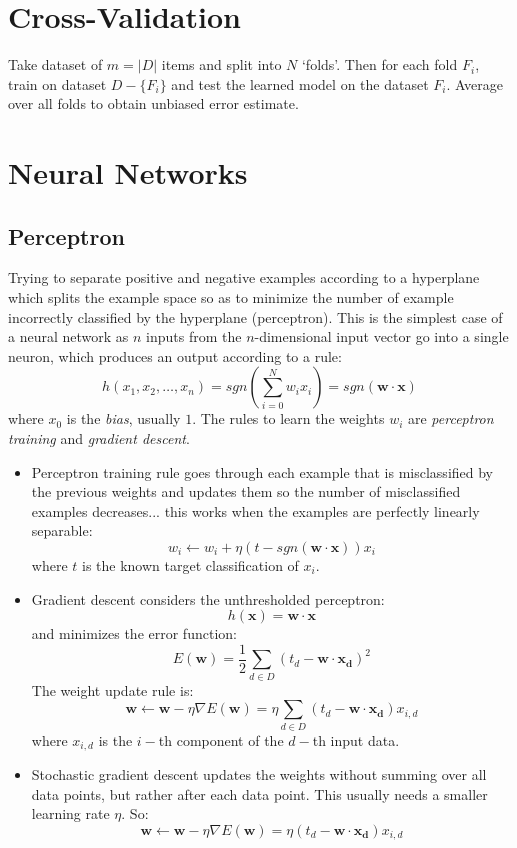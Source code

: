 \documentclass[a4paper,10pt]{article}
\begin{document}
\section{Cross-Validation}
Take dataset of $m = |D|$ items and split into $N$ `folds'.  Then for each fold $F_i$, train on dataset $D - \{F_i\}$ and test the learned model on the dataset $F_i$.  Average over all folds to obtain unbiased error estimate.

\section{Neural Networks}
\subsection{Perceptron}
Trying to separate positive and negative examples according to a hyperplane which splits the example space so as to minimize the number of example incorrectly classified by the hyperplane (perceptron).  This is the simplest case of a neural network as $n$ inputs from the $n$-dimensional input vector go into a single neuron, which produces an output according to a rule:
$$
h(x_1, x_2, \ldots, x_n) = sgn\left(\sum_{i=0}^N w_i x_i\right) = sgn(\mathbf{w}\cdot\mathbf{x})
$$
where $x_0$ is the \emph{bias}, usually $1$.  The rules to learn the weights $w_i$ are \emph{perceptron training} and \emph{gradient descent}.
\begin{itemize}
\item Perceptron training rule goes through each example that is misclassified by the previous weights and updates them so the number of misclassified examples decreases... this works when the examples are perfectly linearly separable:
$$
w_i \leftarrow w_i + \eta (t - sgn(\mathbf{w}\cdot\mathbf{x})) x_i
$$
where $t$ is the known target classification of $x_i$.
\item Gradient descent considers the unthresholded perceptron:
$$
h(\mathbf{x}) = \mathbf{w}\cdot\mathbf{x}
$$
and minimizes the error function:
$$
E(\mathbf{w}) = \frac{1}{2}\sum_{d\in D} (t_d - \mathbf{w}\cdot\mathbf{x_d})^2
$$
The weight update rule is:
$$
\mathbf{w} \leftarrow \mathbf{w} - \eta \nabla E(\mathbf{w}) = \eta \sum_{d\in D} (t_d - \mathbf{w}\cdot\mathbf{x_d})x_{i,d}
$$
where $x_{i,d}$ is the $i-$th component of the $d-$th input data.
\item Stochastic gradient descent updates the weights without summing over all data points, but rather after each data point.  This usually needs a smaller learning rate $\eta$.  So:
$$
\mathbf{w} \leftarrow \mathbf{w} - \eta \nabla E(\mathbf{w}) = \eta (t_d - \mathbf{w}\cdot\mathbf{x_d})x_{i,d}
$$
\end{itemize}
\end{document}
